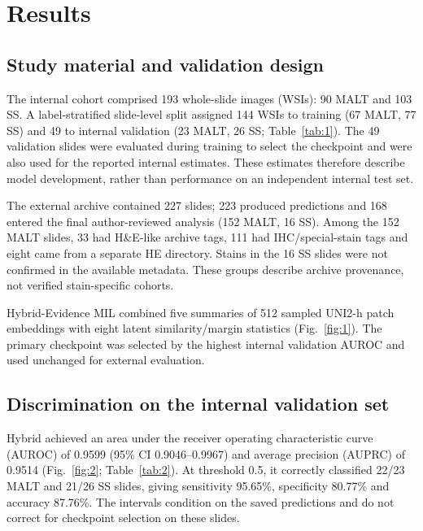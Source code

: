 \section{Results}
\subsection{Study material and validation design}

The internal cohort comprised 193 whole-slide images (WSIs): 90 MALT and 103 SS. A label-stratified slide-level split assigned 144 WSIs to training (67 MALT, 77 SS) and 49 to internal validation (23 MALT, 26 SS; Table~\ref{tab:1}). The 49 validation slides were evaluated during training to select the checkpoint and were also used for the reported internal estimates. These estimates therefore describe model development, rather than performance on an independent internal test set. 

\MainTableOne

The external archive contained 227 slides; 223 produced predictions and 168 entered the final author-reviewed analysis (152 MALT, 16 SS). Among the 152 MALT slides, 33 had H\&E-like archive tags, 111 had IHC/special-stain tags and eight came from a separate HE directory. Stains in the 16 SS slides were not confirmed in the available metadata. These groups describe archive provenance, not verified stain-specific cohorts. 

Hybrid-Evidence MIL combined five summaries of 512 sampled UNI2-h patch embeddings with eight latent similarity/margin statistics (Fig.~\ref{fig:1}). The primary checkpoint was selected by the highest internal validation AUROC and used unchanged for external evaluation.

\MainFigureOne

\subsection{Discrimination on the internal validation set}

Hybrid achieved an area under the receiver operating characteristic curve (AUROC) of 0.9599 (95\% CI 0.9046--0.9967) and average precision (AUPRC) of 0.9514 (Fig.~\ref{fig:2}; Table~\ref{tab:2}). At threshold 0.5, it correctly classified 22/23 MALT and 21/26 SS slides, giving sensitivity 95.65\%, specificity 80.77\% and accuracy 87.76\%. The intervals condition on the saved predictions and do not correct for checkpoint selection on these slides.

